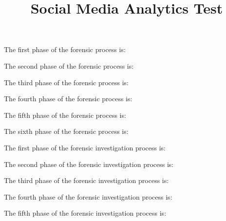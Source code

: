 \documentclass[theme=sleek, randomorder, hidesidemenu]{webquiz}
\title{Social Media Analytics Test}
\begin{document}
\begin{question}
  The first phase of the forensic process is:
\end{question}

\begin{question}
  The second phase of the forensic process is:
\end{question}

\begin{question}
  The third phase of the forensic process is:
\end{question}

\begin{question}
  The fourth phase of the forensic process is:
\end{question}

\begin{question}
  The fifth phase of the forensic process is:
\end{question}

\begin{question}
  The sixth phase of the forensic process is:
\end{question}

\begin{question}
  The first phase of the forensic investigation process is:
\end{question}

\begin{question}
  The second phase of the forensic investigation process is:
\end{question}

\begin{question}
  The third phase of the forensic investigation process is:
\end{question}

\begin{question}
  The fourth phase of the forensic investigation process is:
\end{question}

\begin{question}
  The fifth phase of the forensic investigation process is:
\end{question}
\end{document}

